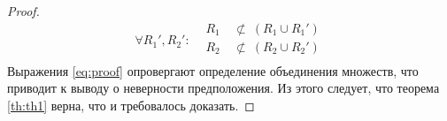 \begin{proof}
	\begin{equation}
		\label{eq:proof}
		\forall R_1', R_2':
		\left.
		\begin{array}{ccc}
			&R_1\ & \not\subset\ (R_1 \cup R_1') \\
			&R_2\ & \not\subset\ (R_2 \cup R_2') \\
		\end{array}
		\right.
	\end{equation}
	\indent Выражения \ref{eq:proof} опровергают определение объединения множеств, что приводит к выводу о неверности предположения.
	Из этого следует, что теорема \ref{th:th1} верна, что и требовалось доказать.
\end{proof}

